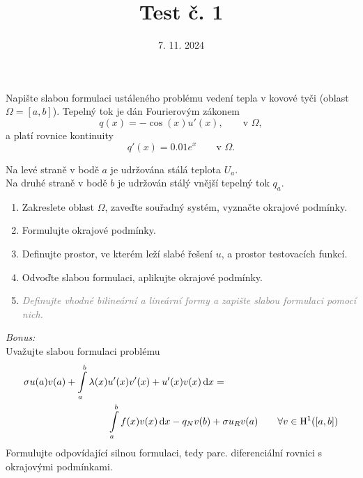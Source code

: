\documentclass{article}
\def\d{{\rm{d}}}
\begin{document}
\title{Test č. 1}
\date{7. 11. 2024}
\author{}
\maketitle


\noindent

Napište slabou formulaci ustáleného problému vedení tepla v kovové tyči (oblast $\Omega=[a,b]$).
Tepelný tok je dán Fourierovým zákonem
\[
    q(x) = -\cos(x)u'(x), \qquad \textrm{v }\Omega,
\]
a platí rovnice kontinuity
\[
    q'(x) = 0.01e^x \qquad \textrm{v }\Omega.
\]

\noindent
Na levé straně v bodě $a$ je udržována stálá teplota $U_a$.\\
Na druhé straně v bodě $b$ je udržován stálý vnější tepelný tok $q_a$.

\begin{enumerate}
\item Zakreslete oblast $\Omega$, zaveďte souřadný systém, vyznačte okrajové podmínky.
\item Formulujte okrajové podmínky.
\item Definujte prostor, ve kterém leží slabé řešení $u$, a prostor testovacích funkcí.
\item Odvoďte slabou formulaci, aplikujte okrajové podmínky.
\item \textit{\textcolor{gray}{Definujte vhodné bilineární a lineární formy a zapište slabou formulaci pomocí nich.}}
\end{enumerate}

\vspace{2cm}
\emph{Bonus:}\\
Uvažujte slabou formulaci problému
\begin{align*}
    \sigma u(a)v(a) + \int\limits_{a}^{b} \lambda(x) & u'(x)v'(x) + u'(x)v(x) \,\d x = \\
        &\int\limits_{a}^{b} f(x)v(x) \,\d x - q_Nv(b) + \sigma u_R v(a) \qquad \forall v\in \mathrm{H}^1([a,b])
\end{align*}
Formulujte odpovídající silnou formulaci, tedy parc. diferenciální rovnici s okrajovými podmínkami.
\end{document}
